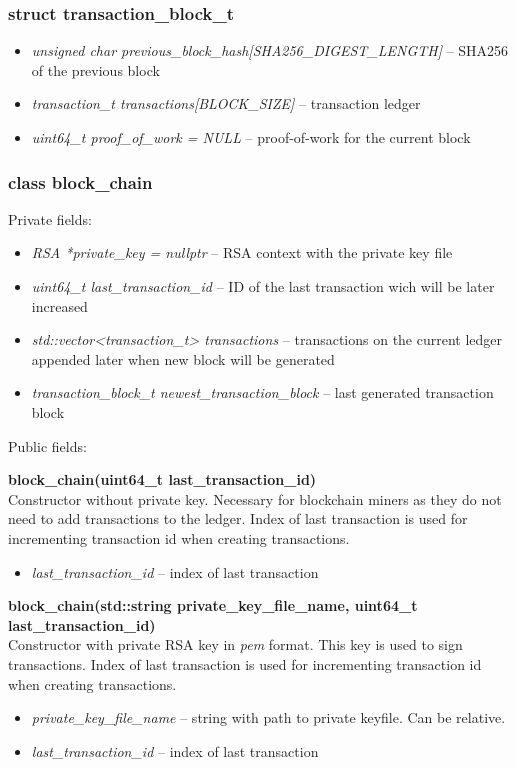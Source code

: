 \documentclass{article}
\begin{document}
\subsubsection{struct transaction\_block\_t}
\begin{itemize}
\item \textit{unsigned char previous\_block\_hash[SHA256\_DIGEST\_LENGTH]} -- SHA256 of the previous block
\item \textit{transaction\_t transactions[BLOCK\_SIZE]} -- transaction ledger
\item \textit{uint64\_t proof\_of\_work = NULL} -- proof-of-work for the current block
\end{itemize}

\subsubsection{class block\_chain}
Private fields:
\begin{itemize}
\item \textit{RSA *private\_key = nullptr} -- RSA context with the private key file
\item \textit{uint64\_t last\_transaction\_id} -- ID of the last transaction wich will be later increased
\item \textit{std::vector<transaction\_t> transactions} -- transactions on the current ledger appended later when new block will be generated
\item \textit{transaction\_block\_t newest\_transaction\_block} -- last generated transaction block
\end{itemize}

Public fields: \\ \par
\textbf{block\_chain(uint64\_t last\_transaction\_id)} \\
Constructor without private key. Necessary for blockchain miners as they do not need to add transactions to the ledger. Index of last transaction is used for incrementing transaction id when creating transactions.
\begin{itemize}
\item \textit{last\_transaction\_id} -- index of last transaction
\end{itemize}

\textbf{block\_chain(std::string private\_key\_file\_name, uint64\_t last\_transaction\_id)} \\
Constructor with private RSA key in \textit{pem} format. This key is used to sign transactions. Index of last transaction is used for incrementing transaction id when creating transactions.
\begin{itemize}
\item \textit{private\_key\_file\_name} -- string with path to private keyfile. Can be relative.
\item \textit{last\_transaction\_id} -- index of last transaction
\end{itemize}
\end{document}

